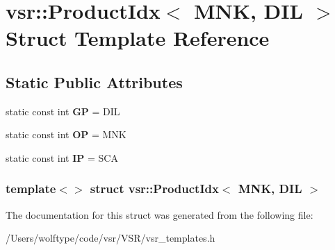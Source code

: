 \hypertarget{structvsr_1_1_product_idx_3_01_m_n_k_00_01_d_i_l_01_4}{\section{vsr\-:\-:Product\-Idx$<$ M\-N\-K, D\-I\-L $>$ Struct Template Reference}
\label{structvsr_1_1_product_idx_3_01_m_n_k_00_01_d_i_l_01_4}
}
\subsection*{Static Public Attributes}
\begin{DoxyCompactItemize}
\item 
\hypertarget{structvsr_1_1_product_idx_3_01_m_n_k_00_01_d_i_l_01_4_a15f9cc1f754ab353da217ebfa2f2b4d0}{static const int {\bfseries G\-P} = D\-I\-L}\label{structvsr_1_1_product_idx_3_01_m_n_k_00_01_d_i_l_01_4_a15f9cc1f754ab353da217ebfa2f2b4d0}

\item 
\hypertarget{structvsr_1_1_product_idx_3_01_m_n_k_00_01_d_i_l_01_4_a63099a086aef555bbb37d3132903b702}{static const int {\bfseries O\-P} = M\-N\-K}\label{structvsr_1_1_product_idx_3_01_m_n_k_00_01_d_i_l_01_4_a63099a086aef555bbb37d3132903b702}

\item 
\hypertarget{structvsr_1_1_product_idx_3_01_m_n_k_00_01_d_i_l_01_4_a4d2ff0458bc5305c3033629ef3c58f6f}{static const int {\bfseries I\-P} = S\-C\-A}\label{structvsr_1_1_product_idx_3_01_m_n_k_00_01_d_i_l_01_4_a4d2ff0458bc5305c3033629ef3c58f6f}

\end{DoxyCompactItemize}
\subsubsection*{template$<$$>$ struct vsr\-::\-Product\-Idx$<$ M\-N\-K, D\-I\-L $>$}



The documentation for this struct was generated from the following file\-:\begin{DoxyCompactItemize}
\item 
/\-Users/wolftype/code/vsr/\-V\-S\-R/vsr\-\_\-templates.\-h\end{DoxyCompactItemize}
